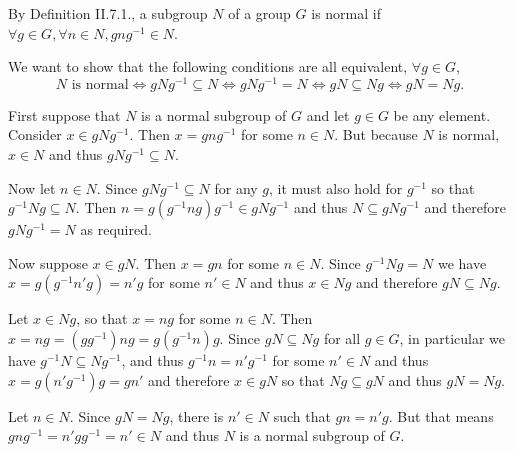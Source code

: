 \begin{problem}
\end{problem}

\begin{solution}
	By Definition II.7.1., a subgroup $N$ of a group $G$ is normal if $\forall g \in G, \forall n \in N, gng^{-1} \in N$.
	
	We want to show that the following conditions are all equivalent, $\forall g \in G$,
	\[
		N \text{ is normal} \iff gNg^{-1} \subseteq N \iff gNg^{-1} = N \iff gN \subseteq Ng \iff gN = Ng\text{.}
	\]
	
	First suppose that $N$ is a normal subgroup of $G$ and let $g \in G$ be any element. Consider $x \in gNg^{-1}$. Then $x = gng^{-1}$ for some $n \in N$. But because $N$ is normal, $x \in N$ and thus $gNg^{-1} \subseteq N$. 
	
	Now let $n \in N$. Since $gNg^{-1} \subseteq N$ for any $g$, it must also hold for $g^{-1}$ so that $g^{-1}Ng \subseteq N$. Then $n = g(g^{-1}ng)g^{-1} \in gNg^{-1}$ and thus $N \subseteq gNg^{-1}$ and therefore $gNg^{-1} = N$ as required. 
	
	Now suppose $x \in gN$. Then $x = gn$ for some $n \in N$. Since $g^{-1}Ng = N$ we have $x =g(g^{-1}n'g) = n'g$ for some $n' \in N$ and thus $x \in Ng$ and therefore $gN \subseteq Ng$. 
	
	Let $x \in Ng$, so that $x = ng$ for some $n \in N$. Then $x = ng = (gg^{-1})ng = g(g^{-1}n)g$. Since $gN \subseteq Ng$ for all $g \in G$, in particular we have $g^{-1}N \subseteq Ng^{-1}$, and thus $g^{-1}n = n' g^{-1}$ for some $n' \in N$ and thus $x = g (n' g^{-1}) g = g n'$ and therefore $x \in gN$ so that $Ng \subseteq gN$ and thus $gN = Ng$.
	
	Let $n \in N$. Since $gN = Ng$, there is $n' \in N$ such that $gn = n'g$. But that means $gng^{-1} = n'gg^{-1} = n' \in N$ and thus $N$ is a normal subgroup of $G$.
\end{solution}

\begin{problem}
\end{problem}

